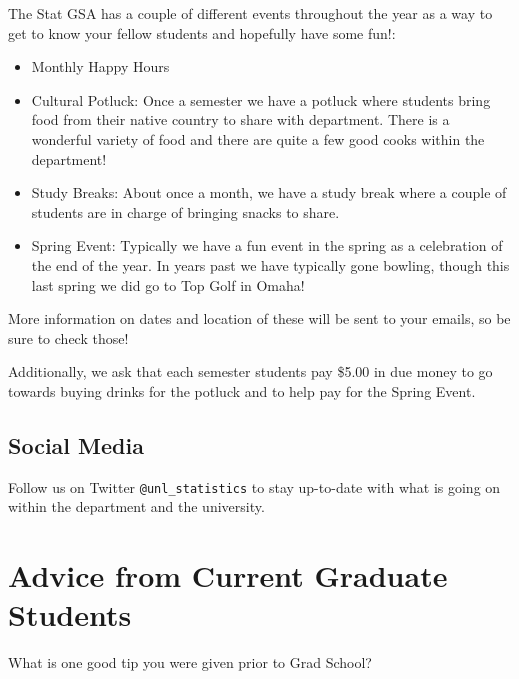 \documentclass[
  12pt,
]{book}
\providecommand{\tightlist}{%
  \setlength{\itemsep}{0pt}\setlength{\parskip}{0pt}}
\begin{document}
The Stat GSA has a couple of different events throughout the year as a way to get to know your fellow students and hopefully have some fun!:

\begin{itemize}
\tightlist
\item
  Monthly Happy Hours
\item
  Cultural Potluck: Once a semester we have a potluck where students bring food from their native country to share with department. There is a wonderful variety of food and there are quite a few good cooks within the department!
\item
  Study Breaks: About once a month, we have a study break where a couple of students are in charge of bringing snacks to share.
\item
  Spring Event: Typically we have a fun event in the spring as a celebration of the end of the year. In years past we have typically gone bowling, though this last spring we did go to Top Golf in Omaha!
\end{itemize}

More information on dates and location of these will be sent to your emails, so be sure to check those!

Additionally, we ask that each semester students pay \$5.00 in due money to go towards buying drinks for the potluck and to help pay for the Spring Event.

\hypertarget{social-media}{%
\section{Social Media}\label{social-media}}

Follow us on Twitter \texttt{@unl\_statistics} to stay up-to-date with what is going on within the department and the university.

\hypertarget{advice}{%
\chapter{Advice from Current Graduate Students}\label{advice}}

What is one good tip you were given prior to Grad School?
\end{document}

